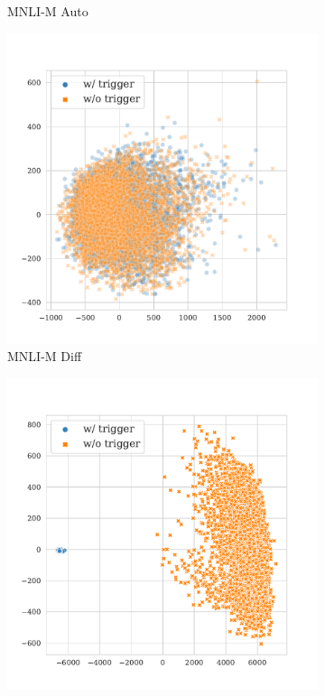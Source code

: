 \begin{figure}[!ht]
\begin{subfigure}{.16\textwidth}
  \caption{\tiny{MNLI-M Auto}}
  \label{fig:mnli_matched_auto_k16_embed_extra}
\end{subfigure}%
\begin{subfigure}{.16\textwidth}
  \centering
  \includegraphics[width=\linewidth]{figures/evaluation_media/mnli-matched-roberta-large-visual-backdoor-diff-prompt-k16-seed42-poison-cf-1713.pdf}
  \caption{\tiny{MNLI-M Diff}}
  \label{fig:mnli_matched_diff_k16_embed_extra}
\end{subfigure}%
\begin{subfigure}{.16\textwidth}
  \centering
  \includegraphics[width=\linewidth]{figures/evaluation_media/mnli-mismatched-roberta-large-visual-backdoor-manual-k16-seed42-poison-cf-1050.pdf}

\end{subfigure}
\end{figure}
